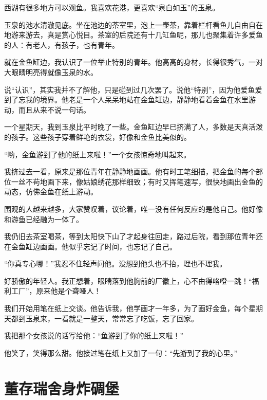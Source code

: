 \documentclass[12pt,UTF-8,openany]{ctexbook}
\begin{document}
\begin{large}
    
    西湖有很多地方可以观鱼。我喜欢花港，更喜欢“泉白如玉”的玉泉。
    
    玉泉的池水清澈见底。坐在池边的茶室里，泡上一壶茶，靠着栏杆看鱼儿自由自在地游来游去，真是赏心悦目。茶室的后院还有十几缸鱼呢，那儿也聚集着许多爱鱼的人：有老人，有孩子，也有青年。
    
    就在金鱼缸边，我认识了一位举止特别的青年。他高高的身材，长得很秀气，一对大眼睛明亮得就像玉泉的水。
    
    说“认识”，其实我并不了解他，只是碰到过几次罢了。说他“特别”，因为他爱鱼爱到了忘我的境界。他老是一个人呆呆地站在金鱼缸边，静静地看着金鱼在水里游动，而且从来不说一句话。
    
    一个星期天，我到玉泉比平时晚了一些。金鱼缸边早已挤满了人，多数是天真活泼的孩子。这些孩子穿着鲜艳的衣裳，好像和金鱼比美似的。
    
    “哟，金鱼游到了他的纸上来啦！”一个女孩惊奇地叫起来。
    
    我挤过去一看，原来是那位青年在静静地画画。他有时工笔细描，把金鱼的每个部位一丝不苟地画下来，像姑娘绣花那样细致；有时又挥笔速写，很快地画出金鱼的动态，仿佛金鱼在纸上游动。
    
    围观的人越来越多，大家赞叹着，议论着，唯一没有任何反应的是他自己。他好像和游鱼已经融为一体了。
    
    我仍旧去茶室喝茶，等到太阳快下山了才起身往回走，路过后院，看到那位青年还在金鱼缸边画画。他似乎忘记了时间，也忘记了自己。
    
    “你真专心哪！”我忍不住轻声问他。没想到他头也不抬，理也不理我。
    
    好骄傲的年轻人。我正想着，眼睛落到他胸前的厂徽上，心不由得咯噔一跳！“福利工厂”，原来他是个聋哑人！
    
    我们开始用笔在纸上交谈。他告诉我，他学画才一年多，为了画好金鱼，每个星期天都到玉泉来，一看就是一整天，常常忘了吃饭，忘了回家。
    
    我把那个女孩说的话写给他：“鱼游到了你的纸上来啦！”
    
    他笑了，笑得那么甜。他接过笔在纸上又加了一句：“先游到了我的心里。”
    
\end{large}



\chapter{董存瑞舍身炸碉堡}
\end{document}
